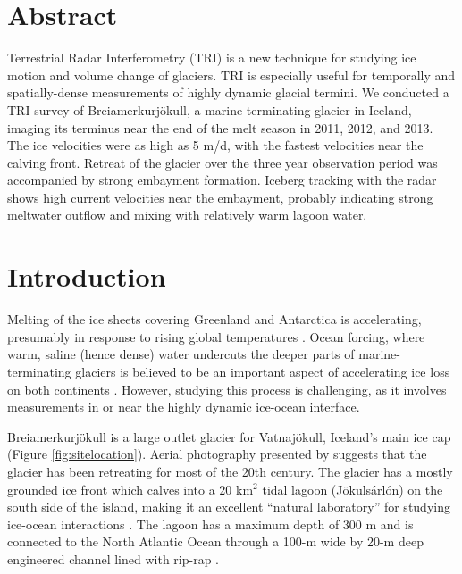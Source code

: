 \section{Abstract}
Terrestrial Radar Interferometry (TRI) is a new technique for studying ice motion and volume change of glaciers. TRI is especially useful for temporally and spatially-dense measurements of highly dynamic glacial termini. We conducted a TRI survey of Brei{\dh}amerkurjökull, a marine-terminating glacier in Iceland, imaging its terminus near the end of the melt season in 2011, 2012, and 2013. The ice velocities were as high as 5 m/d, with the fastest velocities near the calving front. Retreat of the glacier over the three year observation period was accompanied by strong embayment formation. Iceberg tracking with the radar shows high current velocities near the embayment, probably indicating strong meltwater outflow and mixing with relatively warm lagoon water.



\section{Introduction}
Melting of the ice sheets covering Greenland and Antarctica is accelerating, presumably in response to rising global temperatures \citep{wouters2008grace, jiang2010accelerating, rignot2011acceleration, shepherd2012reconciled}. Ocean forcing, where warm, saline (hence dense) water undercuts the deeper parts of marine-terminating glaciers \citep{motyka2003submarine} is believed to be an important aspect of accelerating ice loss on both continents \citep{payne2004recent,shepherd2004warm,holland2008acceleration,straneo2010rapid,straneo2012characteristics,joughin2012ice,park2013sustained}. However, studying this process is challenging, as it involves measurements in or near the highly dynamic ice-ocean interface.
  

Brei{\dh}amerkurjökull is a large outlet glacier for Vatnajökull, Iceland’s main ice cap (Figure \ref{fig:sitelocation}). Aerial photography presented by \citet{bjornsson2001jokulsarlon} suggests that the glacier has been retreating for most of the 20th century. The glacier has a mostly grounded ice front which calves into a 20 km$^2$ tidal lagoon (Jökulsárlón) on the south side of the island, making it an excellent “natural laboratory” for studying ice-ocean interactions \citep{howat2008dynamic}.  The lagoon has a maximum depth of 300 m and is connected to the North Atlantic Ocean through a 100-m wide by 20-m deep engineered channel lined with rip-rap \citep{bjornsson1996scales}. 

